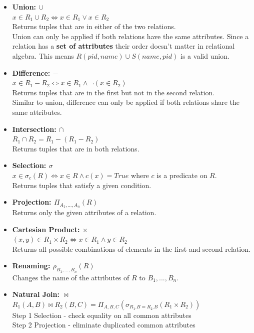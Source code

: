 \begin{itemize}
\item \textbf{Union: $\cup$}\\
$x \in R_1 \cup R_2 \iff x \in R_1 \lor x \in R_2$\\
Returns tuples that are in either of the two relations.\\
Union can only be applied if both relations have the same attributes. Since a relation has a \textbf{set of attributes} their order doesn't matter in relational algebra. This means $R(pid, name) \cup S(name, pid)$ is a valid union.
\item  \textbf{Difference: $-$}\\
$x \in R_1 - R_2 \iff x \in R_1 \land \neg(x \in R_2)$\\
Returns tuples that are in the first but not in the second relation.\\
Similar to union, difference can only be applied if both relations share the same attributes.
\item \textbf{Intersection: $\cap$}\\
$R_1 \cap R_2 = R_1 - (R_1 - R_2)$\\
Returns tuples that are in both relations.
\item \textbf{Selection: $\sigma$}\\
$x \in \sigma_c(R) \iff x \in R \land c(x) = True$ where $c$ is a predicate on $R$.\\
Returns tuples that satisfy a given condition.
\item \textbf{Projection: $\Pi_{A_1, ..., A_n}(R)$}\\
Returns only the given attributes of a relation.
\item \textbf{Cartesian Product: $\times$}\\
$(x,y) \in R_1 \times R_2 \iff x \in R_1 \land y \in R_2$\\
Returns all possible combinations of elements in the first and second relation.
\item \textbf{Renaming: $\rho_{B_1, ..., B_n}(R)$}\\
Changes the name of the attributes of $R$ to $B_1, ..., B_n$.
\item \textbf{Natural Join: $\Join$}\\
$R_1(A,B) \Join R_2(B, C) = \Pi_{A,B,C}(\sigma_{R_1.B=R_2.B}(R_1 \times R_2))$\\
Step 1 Selection - check equality on all common attributes\\
Step 2 Projection - eliminate duplicated common attributes\\

\end{itemize}
